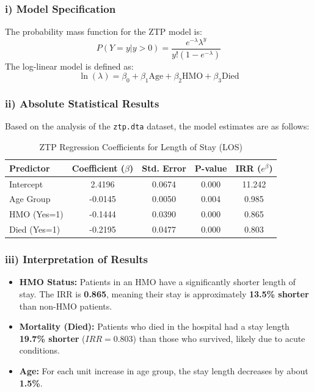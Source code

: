 \documentclass[12pt, a4paper]{article}
\begin{document}
\subsubsection{i) Model Specification}
The probability mass function for the ZTP model is:
\[ P(Y=y | y > 0) = \frac{e^{-\lambda} \lambda^y}{y! (1 - e^{-\lambda})} \]
The log-linear model is defined as:
\[ \ln(\lambda) = \beta_0 + \beta_1 \text{Age} + \beta_2 \text{HMO} + \beta_3 \text{Died} \]

\subsubsection{ii) Absolute Statistical Results}
Based on the analysis of the \texttt{ztp.dta} dataset, the model estimates are as follows:

\begin{table}[h!]
\centering
\caption{ZTP Regression Coefficients for Length of Stay (LOS)}
\begin{tabular}{@{}lcccc@{}}
\toprule
Predictor & Coefficient ($\beta$) & Std. Error & P-value & IRR ($e^\beta$) \\ \midrule
Intercept & 2.4196 & 0.0674 & 0.000 & 11.242 \\
Age Group & -0.0145 & 0.0050 & 0.004 & 0.985 \\
HMO (Yes=1) & -0.1444 & 0.0390 & 0.000 & 0.865 \\
Died (Yes=1) & -0.2195 & 0.0477 & 0.000 & 0.803 \\ \bottomrule
\end{tabular}
\end{table}

\subsubsection{iii) Interpretation of Results}
\begin{itemize}
    \item \textbf{HMO Status:} Patients in an HMO have a significantly shorter length of stay. The IRR is \textbf{0.865}, meaning their stay is approximately \textbf{13.5\% shorter} than non-HMO patients.
    \item \textbf{Mortality (Died):} Patients who died in the hospital had a stay length \textbf{19.7\% shorter} ($IRR = 0.803$) than those who survived, likely due to acute conditions.
    \item \textbf{Age:} For each unit increase in age group, the stay length decreases by about \textbf{1.5\%}.
\end{itemize}
\end{document}
